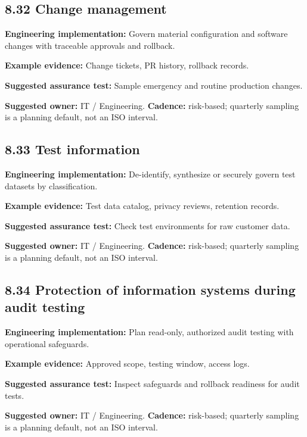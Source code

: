 \documentclass[11pt,letterpaper]{article}
\begin{document}
\subsection{8.32 Change management}
\textbf{Engineering implementation:} Govern material configuration and software changes with traceable approvals and rollback.\par
\textbf{Example evidence:} Change tickets, PR history, rollback records.\par
\textbf{Suggested assurance test:} Sample emergency and routine production changes.\par
\textbf{Suggested owner:} IT / Engineering. \textbf{Cadence:} risk-based; quarterly sampling is a planning default, not an ISO interval.\par
{}
\subsection{8.33 Test information}
\textbf{Engineering implementation:} De-identify, synthesize or securely govern test datasets by classification.\par
\textbf{Example evidence:} Test data catalog, privacy reviews, retention records.\par
\textbf{Suggested assurance test:} Check test environments for raw customer data.\par
\textbf{Suggested owner:} IT / Engineering. \textbf{Cadence:} risk-based; quarterly sampling is a planning default, not an ISO interval.\par
{}
\subsection{8.34 Protection of information systems during audit testing}
\textbf{Engineering implementation:} Plan read-only, authorized audit testing with operational safeguards.\par
\textbf{Example evidence:} Approved scope, testing window, access logs.\par
\textbf{Suggested assurance test:} Inspect safeguards and rollback readiness for audit tests.\par
\textbf{Suggested owner:} IT / Engineering. \textbf{Cadence:} risk-based; quarterly sampling is a planning default, not an ISO interval.\par
{}
\end{document}
